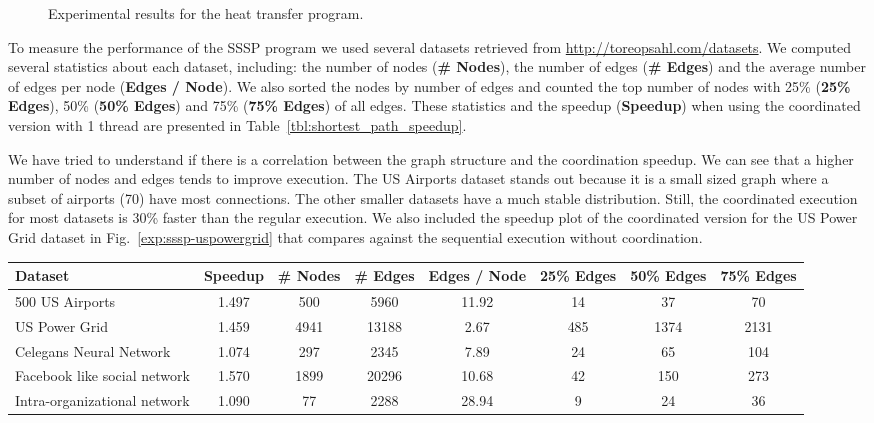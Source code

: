 \begin{figure}[h!]
     \centering
   \caption{Experimental results for the heat transfer program.}
   \label{exp:heat-transfer}
\end{figure}

To measure the performance of the SSSP program we used several datasets retrieved from \url{http://toreopsahl.com/datasets}. We computed several
statistics about each dataset, including: the number of nodes (\textbf{\# Nodes}), the number of edges (\textbf{\# Edges}) and
the average number of edges per node (\textbf{Edges / Node}). We also sorted the nodes by number of edges and counted the top number of nodes
with 25\% (\textbf{25\% Edges}), 50\% (\textbf{50\% Edges}) and 75\% (\textbf{75\% Edges}) of all edges.
These statistics and the speedup (\textbf{Speedup}) when using the coordinated version with 1 thread are presented in Table~\ref{tbl:shortest_path_speedup}.

We have tried to understand if there is a correlation between the graph structure and the coordination speedup. We can see that a higher number
of nodes and edges tends to improve execution. The US Airports dataset stands out because it is a small sized graph where a subset of airports
(70) have most connections. The other smaller datasets have a much stable distribution.
Still, the coordinated execution for most datasets is 30\% faster than the regular execution. We also included the speedup plot of the coordinated version
for the US Power Grid dataset in Fig.~\ref{exp:sssp-uspowergrid} that compares against the sequential execution without coordination.

\begin{table*}[ht]

\begin{center}
    \begin{tabular}{| l | c | c | c | c | c | c | c |}
    \hline
    \textbf{Dataset} & \textbf{Speedup} & \textbf{\# Nodes} & \textbf{\# Edges} & \textbf{Edges / Node} & \textbf{25\% Edges} & \textbf{50\% Edges} & \textbf{75\% Edges} \\ \hline \hline
    500 US Airports & 1.497 & 500 & 5960 & 11.92 & 14 & 37 & 70 \\ \hline
    US Power Grid & 1.459 & 4941 & 13188 & 2.67 & 485 & 1374 & 2131 \\ \hline
    Celegans Neural Network & 1.074 & 297 & 2345 & 7.89 & 24 & 65 & 104 \\ \hline
    Facebook like social network & 1.570 & 1899 & 20296 & 10.68 & 42 & 150 & 273 \\ \hline
    Intra-organizational network & 1.090 & 77 & 2288 & 28.94 & 9 & 24 & 36 \\ \hline
    \end{tabular}
\end{center}
     \caption{Summarized information about the datasets used in the SSSP program.}
     \label{tbl:shortest_path_speedup}
\end{table*}

